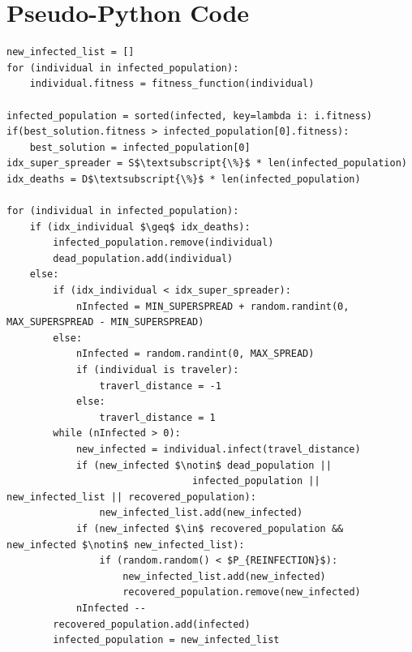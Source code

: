 \documentclass[letterpaper]{article}%
\begin{document}
\section{Pseudo-Python Code}
\lstset{language=Python}
\lstset{frame=lines}
\lstset{basicstyle=\footnotesize}
\lstset{showstringspaces=false}
\lstset{numbers=left}		%
\lstset{stepnumber=1}
\begin{lstlisting}[mathescape=true]
new_infected_list = []
for (individual in infected_population):
    individual.fitness = fitness_function(individual)

infected_population = sorted(infected, key=lambda i: i.fitness)
if(best_solution.fitness > infected_population[0].fitness):
    best_solution = infected_population[0]
idx_super_spreader = S$\textsubscript{\%}$ * len(infected_population)
idx_deaths = D$\textsubscript{\%}$ * len(infected_population)

for (individual in infected_population):
    if (idx_individual $\geq$ idx_deaths):
        infected_population.remove(individual)
        dead_population.add(individual)
    else:
        if (idx_individual < idx_super_spreader):
            nInfected = MIN_SUPERSPREAD + random.randint(0, MAX_SUPERSPREAD - MIN_SUPERSPREAD)
        else:
            nInfected = random.randint(0, MAX_SPREAD)
            if (individual is traveler):
                traverl_distance = -1
            else: 
                traverl_distance = 1
        while (nInfected > 0):
            new_infected = individual.infect(travel_distance)
            if (new_infected $\notin$ dead_population || 
                                infected_population || new_infected_list || recovered_population): 
                new_infected_list.add(new_infected)
            if (new_infected $\in$ recovered_population && new_infected $\notin$ new_infected_list): 
                if (random.random() < $P_{REINFECTION}$): 
                    new_infected_list.add(new_infected)
                    recovered_population.remove(new_infected)
            nInfected --
        recovered_population.add(infected) 
        infected_population = new_infected_list
\end{lstlisting}
\lstset{language=Python}
\lstset{frame=lines}
\lstset{basicstyle=\footnotesize}
\lstset{showstringspaces=false}
\lstset{numbers=left}				
\lstset{stepnumber=1}
\end{document}
